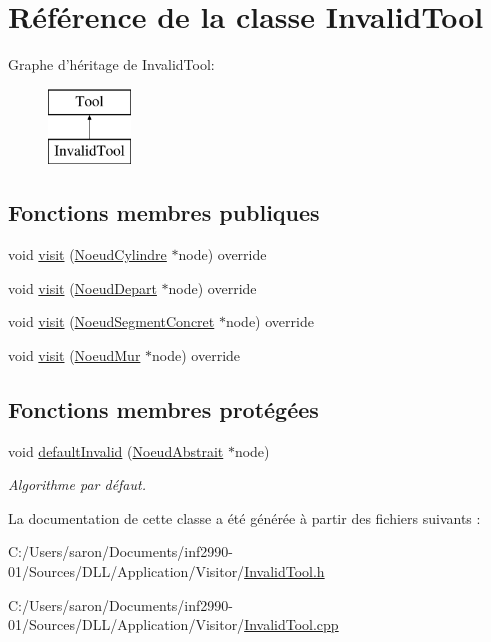 \hypertarget{class_invalid_tool}{\section{Référence de la classe Invalid\-Tool}
\label{class_invalid_tool}
}
Graphe d'héritage de Invalid\-Tool\-:\begin{figure}[H]
\begin{center}
\leavevmode
\includegraphics[height=2.000000cm]{class_invalid_tool}
\end{center}
\end{figure}
\subsection*{Fonctions membres publiques}
\begin{DoxyCompactItemize}
\item 
void \hyperlink{group__inf2990_ga55674ebdcf4c31ced5df732e2424d282}{visit} (\hyperlink{class_noeud_cylindre}{Noeud\-Cylindre} $\ast$node) override
\item 
void \hyperlink{group__inf2990_gabbc70a0da4b0aadac5a37f1fce30cb7a}{visit} (\hyperlink{class_noeud_depart}{Noeud\-Depart} $\ast$node) override
\item 
void \hyperlink{group__inf2990_ga2f8397c63d7f895906f49ab95de03f13}{visit} (\hyperlink{class_noeud_segment_concret}{Noeud\-Segment\-Concret} $\ast$node) override
\item 
void \hyperlink{group__inf2990_gab69a438cb8d2abff211cd450c9f946f5}{visit} (\hyperlink{class_noeud_mur}{Noeud\-Mur} $\ast$node) override
\end{DoxyCompactItemize}
\subsection*{Fonctions membres protégées}
\begin{DoxyCompactItemize}
\item 
void \hyperlink{group__inf2990_gafb96baa12cb0df8c48c84dd12badd757}{default\-Invalid} (\hyperlink{class_noeud_abstrait}{Noeud\-Abstrait} $\ast$node)
\begin{DoxyCompactList}\small\item\em Algorithme par défaut. \end{DoxyCompactList}\end{DoxyCompactItemize}


La documentation de cette classe a été générée à partir des fichiers suivants \-:\begin{DoxyCompactItemize}
\item 
C\-:/\-Users/saron/\-Documents/inf2990-\/01/\-Sources/\-D\-L\-L/\-Application/\-Visitor/\hyperlink{_invalid_tool_8h}{Invalid\-Tool.\-h}\item 
C\-:/\-Users/saron/\-Documents/inf2990-\/01/\-Sources/\-D\-L\-L/\-Application/\-Visitor/\hyperlink{_invalid_tool_8cpp}{Invalid\-Tool.\-cpp}\end{DoxyCompactItemize}
